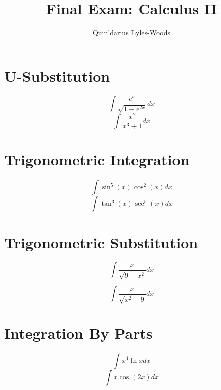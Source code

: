 \documentclass{article}
\title{Final Exam: Calculus II}
\author{Quin'darius Lyles-Woods}
\begin{document}
\maketitle
\Large
\section{U-Substitution}
\begin{equation*}
\int 
\frac
{e^x}
{\sqrt{1-e^{2x}}}
dx
\end{equation*}
\vspace{3.5in}
\begin{equation*}
\int 
\frac
{x^2}
{x^3+1}
dx
\end{equation*}

\pagebreak
\section{Trigonometric Integration}
\begin{equation*}
\int
\sin^5(x)
\cos^2(x)
dx
\end{equation*}
\vspace{3.5in}
\begin{equation*}
\int
\tan^3(x)
\sec^5(x)
dx
\end{equation*}

\pagebreak
\section{Trigonometric Substitution}
\begin{equation*}
	\int 
	\frac{x}
	{\sqrt{9-x^2}}dx
\end{equation*}

\vspace{3.5in}

\begin{equation*}
	\int 
	\frac{x}
	{\sqrt{x^2-9}}dx
\end{equation*}

\pagebreak
\section{Integration By Parts}
\begin{equation*}
	\int
	x^4 \ln x dx
\end{equation*}
\vspace{2.5in}
\begin{equation*}
	\int
	x \cos(2x) dx
\end{equation*}

\pagebreak
\end{document}
